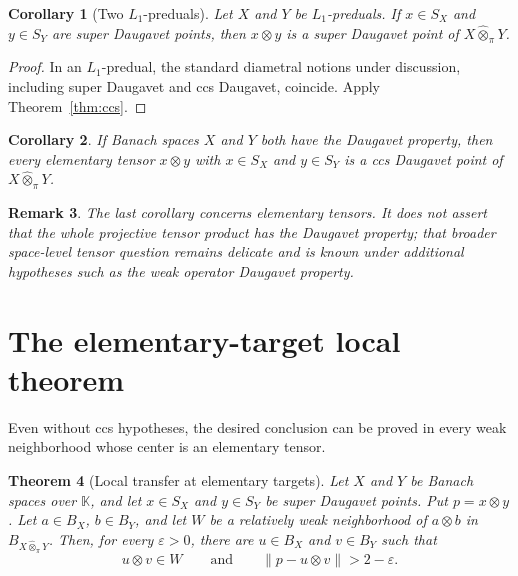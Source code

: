 \documentclass[11pt]{article}
\newtheorem{theorem}{Theorem}[section]
\newtheorem{corollary}[theorem]{Corollary}
\newtheorem{remark}[theorem]{Remark}
\theoremstyle{definition}
\newcommand{\K}{\mathbb K}
\newcommand{\whotpi}{\widehat{\otimes}_{\pi}}
\begin{document}
\begin{corollary}[Two $L_1$-preduals]
Let $X$ and $Y$ be $L_1$-preduals.  If $x\in S_X$ and $y\in S_Y$ are
super Daugavet points, then $x\otimes y$ is a super Daugavet point of
$X\whotpi Y$.
\end{corollary}

\begin{proof}
In an $L_1$-predual, the standard diametral notions under discussion,
including super Daugavet and ccs Daugavet, coincide.  Apply
Theorem~\ref{thm:ccs}.
\end{proof}

\begin{corollary}
If Banach spaces $X$ and $Y$ both have the Daugavet property, then every
elementary tensor $x\otimes y$ with $x\in S_X$ and $y\in S_Y$ is a ccs
Daugavet point of $X\whotpi Y$.
\end{corollary}

\begin{remark}
The last corollary concerns elementary tensors.  It does not assert that the
whole projective tensor product has the Daugavet property; that broader
space-level tensor question remains delicate and is known under additional
hypotheses such as the weak operator Daugavet property.
\end{remark}

\section{The elementary-target local theorem}\label{sec:elementary}

Even without ccs hypotheses, the desired conclusion can be proved in every
weak neighborhood whose center is an elementary tensor.

\begin{theorem}[Local transfer at elementary targets]
\label{thm:elementary-local}
Let $X$ and $Y$ be Banach spaces over $\K$, and let $x\in S_X$ and
$y\in S_Y$ be super Daugavet points.  Put $p=x\otimes y$.  Let $a\in B_X$,
$b\in B_Y$, and let $W$ be a relatively weak neighborhood of $a\otimes b$
in $B_{X\whotpi Y}$.  Then, for every $\varepsilon>0$, there are $u\in B_X$
and $v\in B_Y$ such that
\[
       u\otimes v\in W
       \qquad\text{and}\qquad
       \|p-u\otimes v\|>2-\varepsilon.
\]
\end{theorem}
\end{document}
